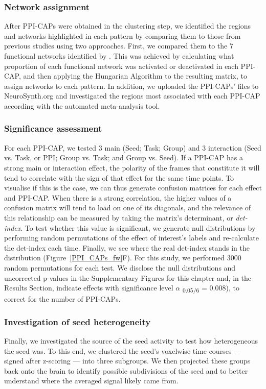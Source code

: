 \subsubsection{Network assignment}
After PPI-CAPs were obtained in the clustering step, we identified the regions and networks highlighted in each pattern by comparing them to those from previous studies using two approaches. First, we compared them to the 7 functional networks identified by \cite{Yeo2011}. This was achieved by calculating what proportion of each functional network was activated or deactivated in each PPI-CAP, and then applying the Hungarian Algorithm \cite{Munkres1957} to the resulting matrix, to assign networks to each pattern.  In addition, we uploaded the PPI-CAPs' files to NeuroSynth.org \citep{Wager2011a} and investigated the regions most associated with each PPI-CAP according with the automated meta-analysis tool. 


\subsubsection{Significance assessment}
For each PPI-CAP, we tested 3 main (Seed; Task; Group) and 3 interaction (Seed vs. Task, or PPI; Group vs. Task; and Group vs. Seed).
If a PPI-CAP has a strong main or interaction effect, the polarity of the frames that constitute it will tend to correlate with the sign of that effect for the same time points. To visualise if this is the case, we can thus generate confusion matrices for each effect and PPI-CAP. When there is a strong correlation, the higher values of a confusion matrix will tend to load on one of its diagonals, and the relevance of this relationship can be measured by taking the matrix's determinant, or \textit{det-index}. To test whether this value is significant, we generate null distributions by performing random permutations of the effect of interest's labels and re-calculate the det-index each time. Finally, we see where the real det-index stands in the distribution (Figure~\ref{PPI_CAPs_fw}F).
For this study, we performed 3000 random permutations for each test. We disclose the null distributions and uncorrected p-values in the Supplementary Figures for this chapter and, in the Results Section, indicate  effects with significance level $\alpha$ \textsubscript{$0.05/6$} = 0.008), to correct for the number of PPI-CAPs.


\subsubsection{Investigation of seed heterogeneity}
Finally, we investigated the source of the seed activity to test how heterogeneous the seed was. To this end, we clustered the seed's voxelwise time courses --- signed after z-scoring --- into three subgroups. We then projected these groups back onto the brain to identify possible subdivisions of the seed and to better understand where the averaged signal likely came from. 




